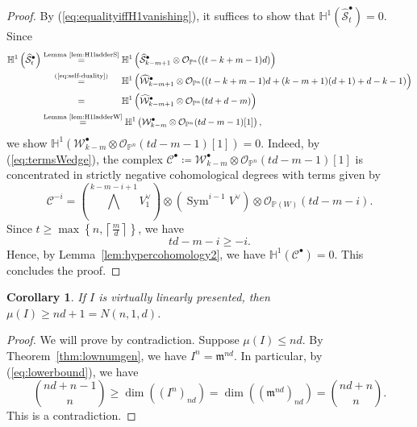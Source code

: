 \documentclass[11pt,letterpaper,reqno]{amsart}
\newcommand{\m}{\mathfrak{m}}
\newcommand{\Sym}{\operatorname{Sym}}
\newcommand{\bb}[1]{\mathbb{#1}}
\newcommand{\mc}[1]{\mathcal{#1}}
\def\PP{{\mathbb P}}
\newtheorem{corollary}[theorem]{Corollary}
\theoremstyle{definition}
\numberwithin{equation}{section}
\begin{document}
\begin{proof}
By (\ref{eq:equalityiffH1vanishing}), it suffices to show that $\mathbb{H}^1(\widehat{\mc{S}}^\bullet_{t}) = 0$. Since
\begin{align*}
    \mathbb{H}^1\left(\widehat{\mc{S}}^\bullet_{t} \right) &\overset{\text{Lemma~\ref{lem:H1ladderS}}}{=} \mathbb{H}^1\left(\widehat{\mc{S}}^\bullet_{k-m+1} \otimes \mc{O}_{\PP^n}((t-k+m-1)d) \right)\\
    &\overset{\text{\makebox[\widthof{\scriptsize \text{Lemma~\ref{lem:H1ladderS}}}][c]{(\ref{eq:self-duality})}}}{=} \mathbb{H}^1\left(\widehat{\mc{W}}^\bullet_{k-m+1} \otimes \mc{O}_{\PP^n}((t-k+m-1)d + (k-m+1)(d+1) + d - k - 1 )\right)\\
    &\overset{\hphantom{\text{Lemma~\ref{lem:H1ladderS}}}}{=}\mathbb{H}^1\left(\widehat{\mc{W}}^\bullet_{k-m+1} \otimes \mc{O}_{\PP^n}(td + d - m)\right)\\
    &\overset{\text{Lemma~\ref{lem:H1ladderW}}}{=}\mathbb{H}^1\left({\mc{W}}^\bullet_{k-m} \otimes \mc{O}_{\PP^n}(td - m - 1)[1]\right),
\end{align*}
we show $\mathbb{H}^1\left({\mc{W}}^\bullet_{k-m} \otimes \mc{O}_{\PP^n}(td - m - 1)[1]\right) = 0$. Indeed, by (\ref{eq:termsWedge}), the complex $\mc{C}^\bullet \coloneqq {\mc{W}}^\bullet_{k-m} \otimes \mc{O}_{\PP^n}(td - m - 1)[1]$ is concentrated in strictly negative cohomological degrees with terms given by
\[\mc{C}^{-i} = \left( \bigwedge^{k-m-i+1}V_1^\vee\right) \otimes \left(\Sym^{i-1} V^\vee\right) \otimes \mc{O}_{\PP(W)}(td-m -i).\]
Since $t \ge \max\left\{ n, \left\lceil\frac{m}{d} \right\rceil\right\}$, we have
\[td-m -i \ge -i.\]
Hence, by Lemma~\ref{lem:hypercohomology2}, we have $\bb{H}^1(\mc{C}^\bullet) = 0$. This concludes the proof.
\end{proof}
\begin{corollary}\label{cor:numgenp1}
    If $I$ is virtually linearly presented, then $\mu(I) \ge nd + 1 = N(n,1,d)$. 
\end{corollary}
\begin{proof}
    We will prove by contradiction. Suppose $\mu(I) \le nd$. By Theorem~\ref{thm:lownumgen}, we have $I^n = \m^{nd}$. In particular, by (\ref{eq:lowerbound}), we have
    \[\binom{nd+n-1}{n} \ge \dim\left( (I^n)_{nd}\right) = \dim\left( (\m^{nd})_{nd}\right) = \binom{nd + n}{n}.\]
    This is a contradiction.
\end{proof}
\end{document}
